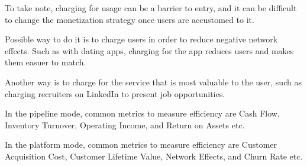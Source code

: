 To take note, charging for usage can be a barrier to entry, and it can be difficult to change the monetization strategy once users are accustomed to it.

Possible way to do it is to charge users in order to reduce negative network effects. 
Such as with dating apps, charging for the app reduces users and makes them easuer to match.

Another way is to charge for the service that is most valuable to the user, such as charging recruiters on LinkedIn to present job opportunities.

In the pipeline mode, common metrics to measure efficiency are
Cash Flow, Inventory Turnover, Operating Income, and Return on Assets etc.

In the platform mode, common metrics to measure efficiency are
Customer Acquisition Cost, Customer Lifetime Value, Network Effects, and Churn Rate etc.

